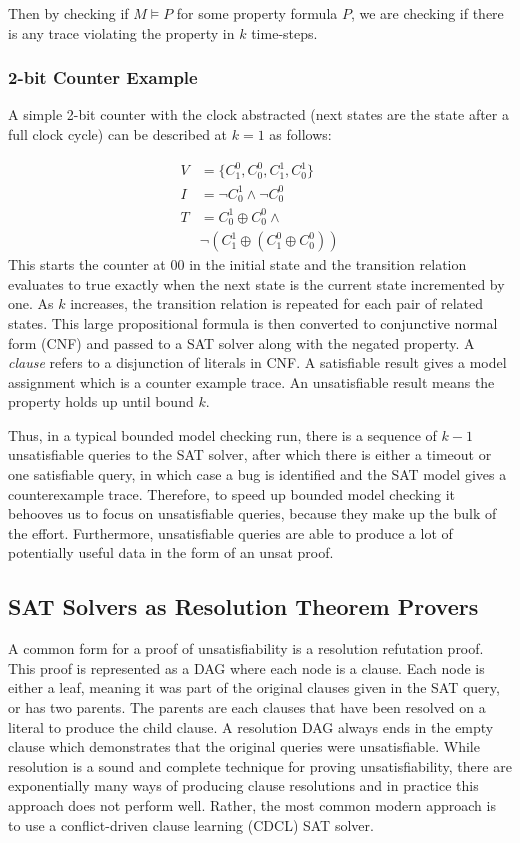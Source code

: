 \documentclass[letterpaper]{article} %
\begin{document}
Then by checking if $M \models P$ for some property formula $P$, we are checking if there is any trace violating the property in $k$ time-steps.

\subsubsection{2-bit Counter Example}

A simple 2-bit counter with the clock abstracted (next states are the state after a full clock cycle) can be described at $k=1$ as follows:

\begin{equation*}
\begin{split}
V &= \{C_1^0, C_0^0, C_1^1, C_0^1\} \\
I &= \neg C_0^1 \wedge \neg C_0^0 \\
T &= C_0^1 \oplus C_0^0 \wedge \\
& \neg (C_1^1 \oplus (C_1^0 \oplus C_0^0))
\end{split}
\end{equation*}
This starts the counter at $00$ in the initial state and the transition relation evaluates to true exactly when the next state is the current state incremented by one. As $k$ increases, the transition relation is repeated for each pair of related states. This large propositional formula is then converted to conjunctive normal form (CNF) and passed to a SAT solver along with the negated property. A \textit{clause} refers to a disjunction of literals in CNF. A satisfiable result gives a model assignment which is a counter example trace. An unsatisfiable result means the property holds up until bound $k$.  

Thus, in a typical bounded model checking run, there is a sequence of $k-1$ unsatisfiable queries to the SAT solver, after which there is either a timeout or one satisfiable query, in which case a bug is identified and the SAT model gives a counterexample trace. Therefore, to speed up bounded model checking it behooves us to focus on unsatisfiable queries, because they make up the bulk of the effort. Furthermore, unsatisfiable queries are able to produce a lot of potentially useful data in the form of an unsat proof.

\subsection{SAT Solvers as Resolution Theorem Provers}

A common form for a proof of unsatisfiability is a resolution refutation proof. This proof is represented as a DAG where each node is a clause. Each node is either a leaf, meaning it was part of the original clauses given in the SAT query, or has two parents. The parents are each clauses that have been resolved on a literal to produce the child clause. A resolution DAG always ends in the empty clause which demonstrates that the original queries were unsatisfiable. While resolution is a sound and complete technique for proving unsatisfiability, there are exponentially many ways of producing clause resolutions and in practice this approach does not perform well. Rather, the most common modern approach is to use a conflict-driven clause learning (CDCL) SAT solver.
\end{document}
